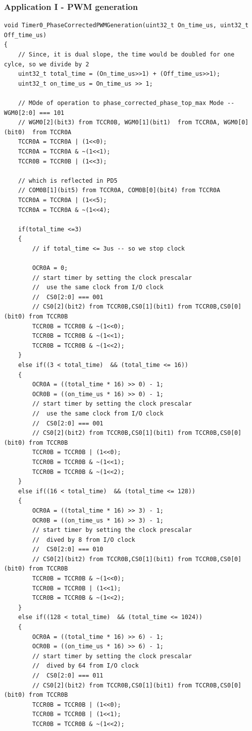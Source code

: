 \documentclass{article}
\begin{document}
\subsubsection{Application I - PWM generation}
\begin{verbatim}
void Timer0_PhaseCorrectedPWMGeneration(uint32_t On_time_us, uint32_t Off_time_us)
{
	// Since, it is dual slope, the time would be doubled for one cylce, so we divide by 2
	uint32_t total_time = (On_time_us>>1) + (Off_time_us>>1);
	uint32_t on_time_us = On_time_us >> 1;
		
	// MOde of operation to phase_corrected_phase_top_max Mode -- WGM0[2:0] === 101
	// WGM0[2](bit3) from TCCR0B, WGM0[1](bit1)  from TCCR0A, WGM0[0](bit0)  from TCCR0A
	TCCR0A = TCCR0A | (1<<0);
	TCCR0A = TCCR0A & ~(1<<1);
	TCCR0B = TCCR0B | (1<<3);	

	// which is reflected in PD5
	// COM0B[1](bit5) from TCCR0A, COM0B[0](bit4) from TCCR0A
	TCCR0A = TCCR0A | (1<<5);
	TCCR0A = TCCR0A & ~(1<<4);
	
	if(total_time <=3)
	{
		// if total_time <= 3us -- so we stop clock
		
		OCR0A = 0;
		// start timer by setting the clock prescalar
		//  use the same clock from I/O clock
		//  CS0[2:0] === 001
		// CS0[2](bit2) from TCCR0B,CS0[1](bit1) from TCCR0B,CS0[0](bit0) from TCCR0B
		TCCR0B = TCCR0B & ~(1<<0);
		TCCR0B = TCCR0B & ~(1<<1);
		TCCR0B = TCCR0B & ~(1<<2);
	}
	else if((3 < total_time)  && (total_time <= 16))
	{
		OCR0A = ((total_time * 16) >> 0) - 1;
		OCR0B = ((on_time_us * 16) >> 0) - 1;
		// start timer by setting the clock prescalar
		//  use the same clock from I/O clock
		//  CS0[2:0] === 001
		// CS0[2](bit2) from TCCR0B,CS0[1](bit1) from TCCR0B,CS0[0](bit0) from TCCR0B
		TCCR0B = TCCR0B | (1<<0);
		TCCR0B = TCCR0B & ~(1<<1);
		TCCR0B = TCCR0B & ~(1<<2);
	}
	else if((16 < total_time)  && (total_time <= 128))
	{
		OCR0A = ((total_time * 16) >> 3) - 1;
		OCR0B = ((on_time_us * 16) >> 3) - 1;
		// start timer by setting the clock prescalar
		//  dived by 8 from I/O clock
		//  CS0[2:0] === 010
		// CS0[2](bit2) from TCCR0B,CS0[1](bit1) from TCCR0B,CS0[0](bit0) from TCCR0B
		TCCR0B = TCCR0B & ~(1<<0);
		TCCR0B = TCCR0B | (1<<1);
		TCCR0B = TCCR0B & ~(1<<2);
	}
	else if((128 < total_time)  && (total_time <= 1024))
	{
		OCR0A = ((total_time * 16) >> 6) - 1;
		OCR0B = ((on_time_us * 16) >> 6) - 1;
		// start timer by setting the clock prescalar
		//  dived by 64 from I/O clock
		//  CS0[2:0] === 011
		// CS0[2](bit2) from TCCR0B,CS0[1](bit1) from TCCR0B,CS0[0](bit0) from TCCR0B
		TCCR0B = TCCR0B | (1<<0);
		TCCR0B = TCCR0B | (1<<1);
		TCCR0B = TCCR0B & ~(1<<2);
		

\end{verbatim}
\end{document}
